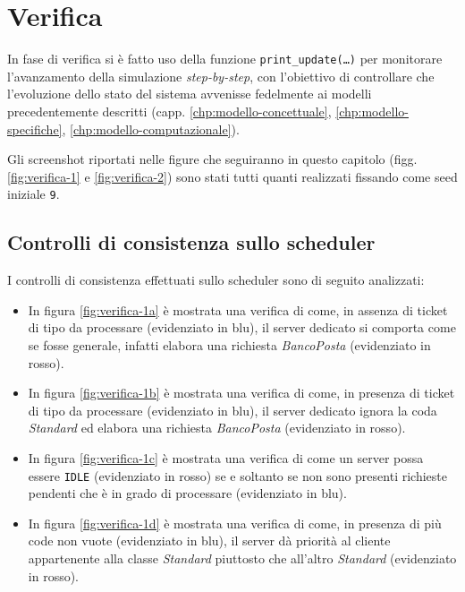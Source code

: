 \chapter{Verifica}\label{chp:verifica}
In fase di verifica si è fatto uso della funzione \texttt{print\_update(\dots)} per monitorare l'avanzamento della simulazione \textit{step-by-step}, con l'obiettivo di controllare che l'evoluzione dello stato del sistema avvenisse fedelmente ai modelli precedentemente descritti (capp. \ref{chp:modello-concettuale}, \ref{chp:modello-specifiche}, \ref{chp:modello-computazionale}).

Gli screenshot riportati nelle figure che seguiranno in questo capitolo (figg. \ref{fig:verifica-1} e \ref{fig:verifica-2}) sono stati tutti quanti realizzati fissando come seed iniziale \texttt{9}.

\section{Controlli di consistenza sullo scheduler}
I controlli di consistenza effettuati sullo scheduler sono di seguito analizzati:
\begin{itemize}
\item In figura \ref{fig:verifica-1a} è mostrata una verifica di come, in assenza di ticket di tipo \sr{} da processare (evidenziato in {\color{verify_blue}blu}), il server dedicato si comporta come se fosse generale, infatti elabora una richiesta \pp{} \textsl{BancoPosta} (evidenziato in {\color{verify_red}rosso}).
\item In figura \ref{fig:verifica-1b} è mostrata una verifica di come, in presenza di ticket di tipo \sr{} da processare (evidenziato in {\color{verify_blue}blu}), il server dedicato ignora la coda \pp{} \textsl{Standard} ed elabora una richiesta \sr{} \textsl{BancoPosta} (evidenziato in {\color{verify_red}rosso}).
\item In figura \ref{fig:verifica-1c} è mostrata una verifica di come un server possa essere \texttt{IDLE} (evidenziato in {\color{verify_red}rosso}) se e soltanto se non sono presenti richieste pendenti che è in grado di processare (evidenziato in {\color{verify_blue}blu}).
\item In figura \ref{fig:verifica-1d} è mostrata una verifica di come, in presenza di più code non vuote (evidenziato in {\color{verify_blue}blu}), il server dà priorità al cliente appartenente alla classe \uo{} \textsl{Standard} piuttosto che all'altro \pp{} \textsl{Standard} (evidenziato in {\color{verify_red}rosso}).
\end{itemize}

